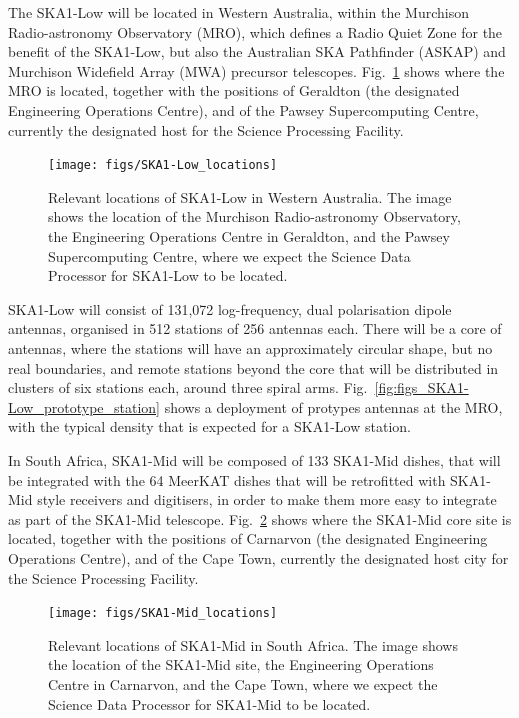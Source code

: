 \documentclass[a4paper,
               biblatex,       %
               keeplastbox,    %
               ]{jacow-2_1}    %
\begin{document}
The SKA1-Low will be located in Western Australia, within the Murchison Radio-astronomy Observatory (MRO), which defines a Radio Quiet Zone for the benefit of the SKA1-Low, but also the Australian SKA Pathfinder (ASKAP) and Murchison Widefield Array (MWA) precursor telescopes. Fig.~\ref{fig:figs_SKA1-Low_locations} shows where the MRO is located, together with the positions of Geraldton (the designated Engineering Operations Centre), and of the Pawsey Supercomputing Centre, currently the designated host for the Science Processing Facility.

\begin{figure}[!tb]
  \centering
    \texttt{[image: figs/SKA1-Low\_locations]}
  \caption{Relevant locations of SKA1-Low in Western Australia. The image shows the location of the Murchison Radio-astronomy Observatory,  the Engineering Operations Centre in Geraldton, and the Pawsey Supercomputing Centre, where we expect the Science Data Processor for SKA1-Low to be located.}
  \label{fig:figs_SKA1-Low_locations}
\end{figure}

SKA1-Low will consist of 131,072 log-frequency, dual polarisation dipole antennas, organised in 512 stations of 256 antennas each. There will be a core of antennas, where the stations will have an approximately circular shape, but no real boundaries, and remote stations beyond the core that will be distributed in clusters of six  stations each, around three spiral arms. Fig.~\ref{fig:figs_SKA1-Low_prototype_station} shows a deployment of protypes antennas at the MRO, with the typical density that is expected for a SKA1-Low station.

In South Africa, SKA1-Mid will be composed of 133 SKA1-Mid dishes, that will be integrated with the 64 MeerKAT dishes that will be retrofitted with SKA1-Mid style receivers and digitisers, in order to make them more easy to integrate as part of the SKA1-Mid telescope.
Fig.~\ref{fig:figs_SKA1-Mid_locations} shows where the SKA1-Mid core site is located, together with the positions of Carnarvon (the designated Engineering Operations Centre), and of the Cape Town, currently the designated host city for the Science Processing Facility.

\begin{figure}[!tb]
  \centering
    \texttt{[image: figs/SKA1-Mid\_locations]}
  \caption{Relevant locations of SKA1-Mid in South Africa. The image shows the location of the SKA1-Mid site,  the Engineering Operations Centre in Carnarvon, and the Cape Town, where we expect the Science Data Processor for SKA1-Mid to be located.}
  \label{fig:figs_SKA1-Mid_locations}
\end{figure}
\end{document}
